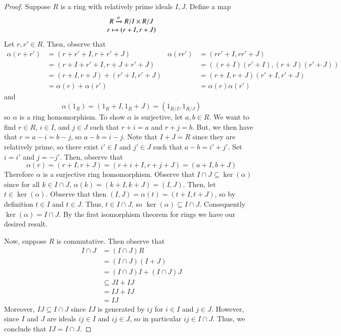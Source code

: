 \documentclass[12pt, a4paper, oneside, openright, titlepage]{book}
\begin{document}
\begin{proof}
    Suppose $R$ is a ring with relatively prime ideals $I, J$. Define a map $$\begin{array}{c} R\xrightarrow{\alpha} R/I \times R/J \\ r \mapsto (r+I, r+J) \end{array}$$
    Let $r,r' \in R$. Then, observe that \begin{align*}
        \alpha(r+r') &= (r+r' + I, r+r' + J) & \alpha(rr') &= (rr' + I, rr' + J) \\
        &= (r+I+r'+I,r+J + r'+J) & &= ((r+I)(r'+I),(r+J)(r'+J)) \\
        &= (r+I,r+J)+(r'+I,r'+J) & &= (r+I,r+J)(r'+I,r'+J) \\
        &= \alpha(r) + \alpha(r') & &= \alpha(r)\alpha(r')
    \end{align*}
    and $$\alpha(1_R) = (1_R + I, 1_R+J) = (1_{R/I},1_{R/J})$$
    so $\alpha$ is a ring homomorphism. To show $\alpha$ is surjective, let $a,b \in R$. We want to find $r \in R$, $i \in I$, and $j \in J$ such that $r+i = a$ and $r+j = b$. But, we then have that $r = a-i = b-j$, so $a-b = i-j$. Note that $I+J = R$ since they are relatively prime, so there exist $i' \in I$ and $j' \in J$ such that $a-b = i' + j'$. Set $i = i'$ and $j = -j'$. Then, observe that $$\alpha(r) = (r+I,r+J) = (r+i + I, r+j + J) = (a+I, b+J)$$
    Therefore $\alpha$ is a surjective ring homomorphism. Observe that $I\cap J \subseteq \ker(\alpha)$ since for all $k \in I \cap J$, $\alpha(k) = (k+I,k+J) = (I,J)$. Then, let $t \in \ker(\alpha)$. Observe that then $(I,J) = \alpha(t) = (t+I,t+J)$, so by definition $t \in I$ and $t \in J$. Thus, $t \in I \cap J$, so $\ker(\alpha) \subseteq I \cap J$. Consequently $\ker(\alpha) = I \cap J$. By the first isomorphism theorem for rings we have our desired result. 
    
    
    Now, suppose $R$ is commutative. Then observe that \begin{align*}
        I \cap J &= (I\cap J)R \\
        &= (I\cap J)(I+J) \\
        &= (I\cap J)I + (I\cap J)J \\
        &\subseteq JI + IJ \\
        &= IJ + IJ \\
        &= IJ
    \end{align*}
    Moreover, $IJ \subseteq I \cap J$ since $IJ$ is generated by $ij$ for $i \in I$ and $j \in J$. However, since $I$ and $J$ are ideals $ij \in I$ and $ij \in J$, so in particular $ij \in I \cap J$. Thus, we conclude that $IJ = I\cap J$.
\end{proof}
\end{document}
